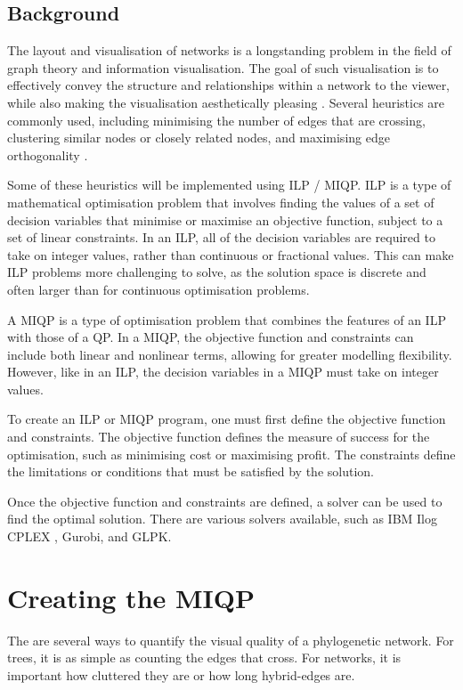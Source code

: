 \documentclass{article}
\begin{document}
\subsection*{Background}
The layout and visualisation of networks is a longstanding problem in the field of graph theory and information visualisation. The goal of such visualisation is to effectively convey the structure and relationships within a network to the viewer, while also making the visualisation aesthetically pleasing \cite{tarawaneh-2012}.  Several heuristics are commonly used, including minimising the number of edges that are crossing, clustering similar nodes or closely related nodes, and maximising edge orthogonality \cite{bennett-2007}. 

Some of these heuristics will be implemented using \ac{ILP} / \ac{MIQP}. 
\ac{ILP} is a type of mathematical optimisation problem that involves finding the values of a set of decision variables that minimise or maximise an objective function, subject to a set of linear constraints. In an \ac{ILP}, all of the decision variables are required to take on integer values, rather than continuous or fractional values. This can make \ac{ILP} problems more challenging to solve, as the solution space is discrete and often larger than for continuous optimisation problems.

A \ac{MIQP} is a type of optimisation problem that combines the features of an \ac{ILP} with those of a \ac{QP}. In a \ac{MIQP}, the objective function and constraints can include both linear and nonlinear terms, allowing for greater modelling flexibility. However, like in an \ac{ILP}, the decision variables in a \ac{MIQP} must take on integer values.

To create an \ac{ILP} or \ac{MIQP} program, one must first define the objective function and constraints. The objective function defines the measure of success for the optimisation, such as minimising cost or maximising profit. The constraints define the limitations or conditions that must be satisfied by the solution.

Once the objective function and constraints are defined, a solver can be used to find the optimal solution. There are various solvers available, such as IBM Ilog CPLEX \cite{ibm-cplex}, Gurobi, and GLPK.

\newpage
\section*{Creating the MIQP}
The are several ways to quantify the visual quality of a phylogenetic network.  For trees, it is as simple as counting the edges that cross. For networks, it is important how cluttered they are or how long hybrid-edges are.
\end{document}
